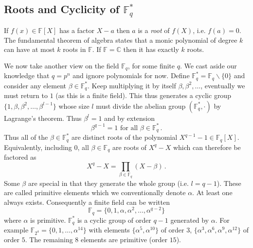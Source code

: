 \documentclass[twocolumn]{revtex4-2}
\begin{document}
\subsection{Roots and Cyclicity of $\mathbb{F}^*_q$}
If $f(x) \in \mathbb{F}[X]$ has a factor $X - a$ then $a$ is a \emph{root} of $f(X)$, i.e. $f(a) = 0$. 
The fundamental theorem of algebra states that a monic polynomial of degree $k$ can have at most $k$ roots in $\mathbb{F}$. If $\mathbb{F} = \mathbb{C}$ then it has exactly $k$ roots.

We now take another view on the field $\mathbb{F}_q$, for some finite $q$. We cast aside our knowledge that $q= p^n$ and ignore polynomials for now. 
Define $\mathbb{F}^*_q = \mathbb{F}_q \backslash \{0\}$ and consider any element $\beta \in \mathbb{F}_q^*$. Keep multiplying it by itself $\beta, \beta^2, \ldots$, eventually we must return to $1$ (as this is a finite field).
This thus generates a cyclic group $\{1, \beta, \beta^2, \ldots , \beta^{l-1}\}$ whose size $l$ must divide the abelian group $(\mathbb{F}_q^*, \cdot)$ by Lagrange's theorem. Thus $\beta^l = 1$ and by extension
\begin{equation}
    \beta^{q-1} = 1 \text{ for all } \beta \in \mathbb{F}_q^* \, .
\end{equation}
Thus all of the $\beta \in \mathbb{F}_q^*$ are distinct roots of the polynomial $X^{q-1}-1 \in \mathbb{F}_q[X]$.
Equivalently, including $0$, all $\beta \in \mathbb{F}_q$ are roots of $X^q - X$ which can therefore be factored as
\begin{equation}
    X^q - X = \prod_{\beta \in \mathbb{F}_q} (X - \beta) \, .
\end{equation}
Some $\beta$ are special in that they generate the whole group (i.e. $l=q-1$). These are called primitive elements which we conventionally denote $\alpha$. At least one always exists.
Consequently a finite field can be written
\begin{equation}
    \mathbb{F}_q = \{0,1,\alpha, \alpha^2, \ldots , \alpha^{q-2}\}
\end{equation}
where $\alpha$ is primitive. $\mathbb{F}_q^*$ is a cyclic group of order $q-1$ generated by $\alpha$. For example $\mathbb{F}_{2^4} = \{0, 1, \ldots , \alpha^{14} \}$ with elements $\{\alpha^5, \alpha^{10}\}$ of order $3$,
$\{ \alpha^3, \alpha^6, \alpha^9, \alpha^{12} \}$ of order $5$. The remaining $8$ elements are primitive (order $15$).
\end{document}
